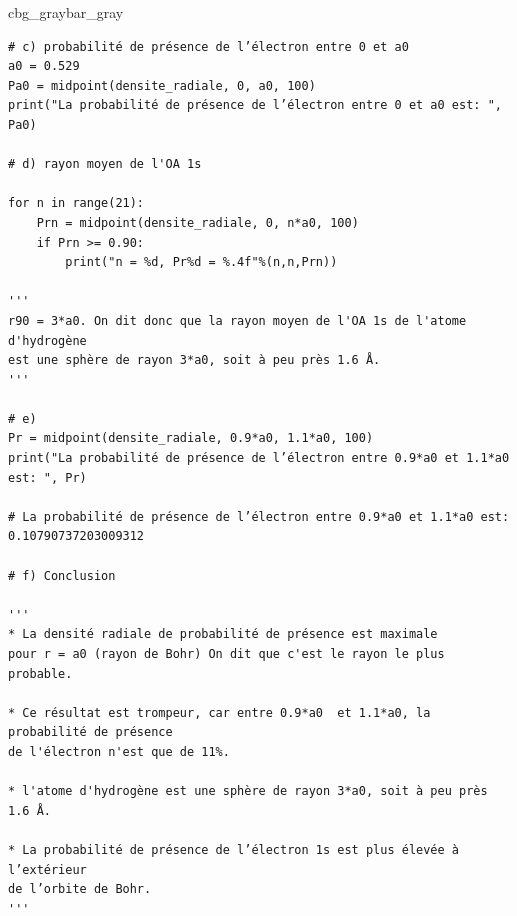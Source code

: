 \documentclass[%
oneside,                 %
final,                   %
10pt,french]{article}
\newenvironment{_pro_tight}[2]{
   \def\FrameCommand{\color{#2}\vrule width 1mm\normalcolor\colorbox{#1}}
   \FrameRule0.6pt\MakeFramed {\advance\hsize-2mm\FrameRestore}\vskip3mm}
   {\vskip0mm\endMakeFramed}
\newenvironment{pro}[2]{
\bgroup\rmfamily
\fboxsep=0mm\relax
\begin{_pro_tight}{#1}{#2}
\list{}{\parsep=-2mm\parskip=0mm\topsep=0pt\leftmargin=2mm
\rightmargin=2\leftmargin\leftmargin=4pt\relax}
\item\relax}
{\endlist\end{_pro_tight}\egroup}
\newenvironment{doconceexercise}{}{}
\begin{document}
\begin{doconceexercise}
\begin{pro}{cbg_gray}{bar_gray}
\begin{verbatim}
# c) probabilité de présence de l’électron entre 0 et a0
a0 = 0.529
Pa0 = midpoint(densite_radiale, 0, a0, 100)
print("La probabilité de présence de l’électron entre 0 et a0 est: ", Pa0)

# d) rayon moyen de l'OA 1s

for n in range(21):
    Prn = midpoint(densite_radiale, 0, n*a0, 100)
    if Prn >= 0.90:
        print("n = %d, Pr%d = %.4f"%(n,n,Prn))
    
'''
r90 = 3*a0. On dit donc que la rayon moyen de l'OA 1s de l'atome d'hydrogène 
est une sphère de rayon 3*a0, soit à peu près 1.6 Å.
'''

# e)
Pr = midpoint(densite_radiale, 0.9*a0, 1.1*a0, 100)
print("La probabilité de présence de l’électron entre 0.9*a0 et 1.1*a0 est: ", Pr)

# La probabilité de présence de l’électron entre 0.9*a0 et 1.1*a0 est:  0.10790737203009312

# f) Conclusion

'''
* La densité radiale de probabilité de présence est maximale 
pour r = a0 (rayon de Bohr) On dit que c'est le rayon le plus probable.

* Ce résultat est trompeur, car entre 0.9*a0  et 1.1*a0, la probabilité de présence
de l'électron n'est que de 11%.

* l'atome d'hydrogène est une sphère de rayon 3*a0, soit à peu près 1.6 Å.

* La probabilité de présence de l’électron 1s est plus élevée à l’extérieur 
de l’orbite de Bohr. 
'''
\end{verbatim}
\end{pro}
\noindent


\end{doconceexercise}



\end{document}
